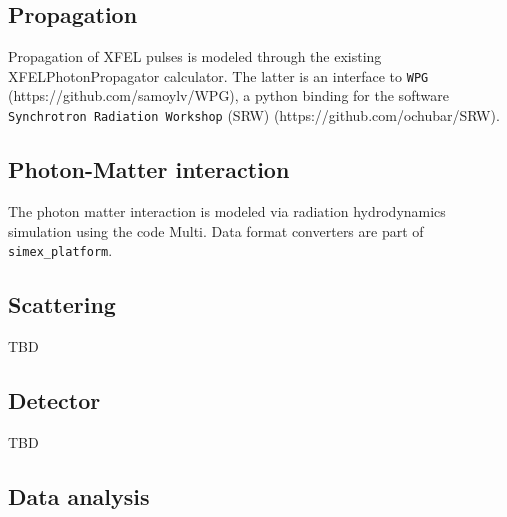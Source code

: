 \documentclass[a4paper]{article}
\begin{document}
\subsection{Propagation}
Propagation of XFEL pulses is modeled through the existing XFELPhotonPropagator calculator. The latter is an interface
to \texttt{WPG} (https://github.com/samoylv/WPG), a python binding for the software \texttt{Synchrotron Radiation Workshop} (SRW)
(https://github.com/ochubar/SRW).
\subsection{Photon-Matter interaction}
The photon matter interaction is modeled via radiation hydrodynamics simulation using the code Multi. Data format converters are part of
\texttt{simex\_platform}.
\subsection{Scattering}
TBD
\subsection{Detector}
TBD
\subsection{Data analysis}
\end{document}
